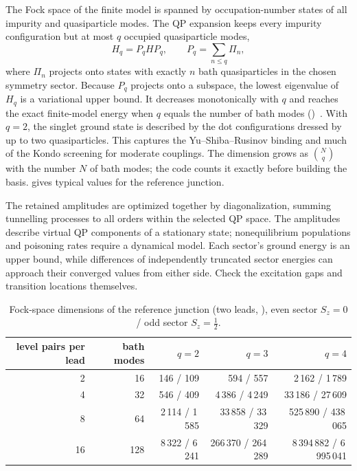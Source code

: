 The Fock space of the finite model is spanned by occupation-number states of all impurity
and quasiparticle modes. The QP expansion keeps every impurity configuration but at most
$q$ occupied quasiparticle modes,
\begin{equation}\label{eq:qp-projection}
  H_q=P_qHP_q ,\qquad
  P_q=\sum_{n\le q}\Pi_n ,
\end{equation}
where $\Pi_n$ projects onto states with exactly $n$ bath quasiparticles in the chosen
symmetry sector. Because $P_q$ projects onto a subspace, the lowest eigenvalue of $H_q$ is
a variational upper bound. It decreases monotonically with $q$ and reaches the exact
finite-model energy when $q$ equals the number of bath modes
()~\cite{ilicin2025variational,ilicin2026effects}. With $q=2$, the
singlet ground state is described by the dot configurations dressed by up to two
quasiparticles. This captures the Yu--Shiba--Rusinov binding and much of the Kondo
screening for moderate couplings. The dimension grows as $\binom{N}{q}$ with the number $N$
of bath modes; the code counts it exactly before building the basis. 
gives typical values for the reference junction.

The retained amplitudes are optimized together by diagonalization, summing
tunnelling processes to all orders within the selected QP space. The amplitudes
describe virtual QP components of a stationary state; nonequilibrium populations
and poisoning rates require a dynamical model. Each sector's ground energy is
an upper bound, while differences of independently truncated sector energies
can approach their converged values from either side. Check the excitation gaps
and transition locations themselves.

\begin{table}[htb]
\centering\small
\caption{Fock-space dimensions of the reference junction (two leads, ),
even sector $S_z=0$ / odd sector $S_z=\tfrac12$.}\label{tab:dimensions}
\begin{tabular}{rrrrr}
\toprule
level pairs per lead & bath modes & $q=2$ & $q=3$ & $q=4$\\
\midrule
2 & 16 & 146 / 109 & 594 / 557 & 2\,162 / 1\,789 \\
4 & 32 & 546 / 409 & 4\,386 / 4\,249 & 33\,186 / 27\,609 \\
8 & 64 & 2\,114 / 1\,585 & 33\,858 / 33\,329 & 525\,890 / 438\,065 \\
16 & 128 & 8\,322 / 6\,241 & 266\,370 / 264\,289 & 8\,394\,882 / 6\,995\,041 \\
\bottomrule
\end{tabular}
\end{table}

